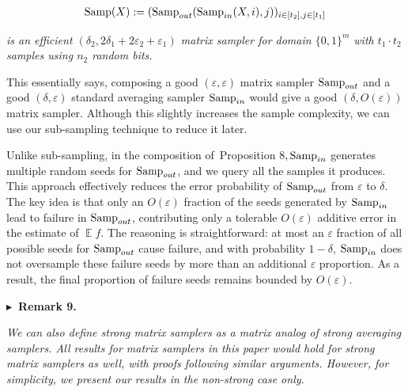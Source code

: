 \documentclass[10pt,a4paper]{article}
\begin{document}
\[\begin{gathered}
\textup{{Samp}}(X):=(\textup{{Samp}}_{out}(\textup{{Samp}}_{in}(X,i),j))_{i\in[t_{2}],j\in[t_{1}]}
\end{gathered}\]


\emph{is an efficient $(\delta_{2},2\delta_{1}+2\varepsilon_{2}+\varepsilon_{1})$ matrix sampler for domain $\{0,1\}^{m}$ with $t_{1}\cdot t_{2}$ samples using $n_{2}$ random bits.}\par






This essentially says, composing a good $(\varepsilon,\varepsilon)$ matrix sampler $\textup{{Samp}}_{out}$ and a good $(\delta,\varepsilon)$ standard averaging sampler $\textup{{Samp}}_{in}$ would give a good $(\delta,O(\varepsilon))$ matrix sampler. Although this slightly increases the sample complexity, we can use our sub-sampling technique to reduce it later.\par




Unlike sub-sampling, in the composition of Proposition 8$,\textup{{Samp}}_{in}$ generates multiple random seeds for $\textup{{Samp}}_{out}$, and we query all the samples it produces. This approach effectively reduces the error probability of $\textup{{Samp}}_{out}$ from $\varepsilon$ to $\delta$. The key idea is that only an $O(\varepsilon)$ fraction of the seeds generated by $\textup{{Samp}}_{in}$ lead to failure in $\textup{{Samp}}_{out}$, contributing only a tolerable $O(\varepsilon)$ additive error in the estimate of $\operatorname*{\mathbb{E}}f$. The reasoning is straightforward: at most an $\varepsilon$ fraction of all possible seeds for $\textup{{Samp}}_{out}$ cause failure, and with probability $1-\delta$, $\textup{{Samp}}_{in}$ does not oversample these failure seeds by more than an additional $\varepsilon$ proportion. As a result, the final proportion of failure seeds remains bounded by $O(\varepsilon)$.\par





\par\medskip\noindent\textbf{
$\blacktriangleright$ Remark 9.
}\par



\emph{We can also define strong matrix samplers as a matrix analog of strong averaging samplers. All results for matrix samplers in this paper would hold for strong matrix samplers as well, with proofs following similar arguments. However, for simplicity, we present our results in the non-strong case only.}\par
\end{document}
